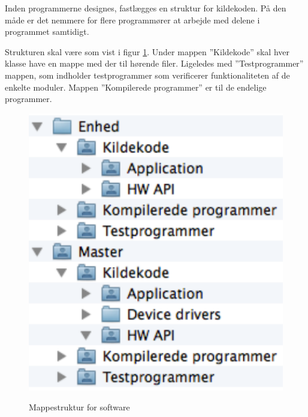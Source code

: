 
Inden programmerne designes, fastlægges en struktur for kildekoden. På den måde er det nemmere for flere programmører at arbejde med delene i programmet samtidigt.

Strukturen skal være som vist i figur \ref{fig:implementationview}. Under mappen ''Kildekode'' skal hver klasse have en mappe med der til hørende filer. Ligeledes med ''Testprogrammer'' mappen, som indholder testprogrammer som verificerer funktionaliteten af de enkelte moduler.
Mappen ''Kompilerede programmer'' er til de endelige programmer.

\begin{figure}[htbp] \centering
{\includegraphics[scale=0.7]{filer/pics/SW-Implementation-View}}
\caption{Mappestruktur for software}
\label{fig:implementationview}
\end{figure}